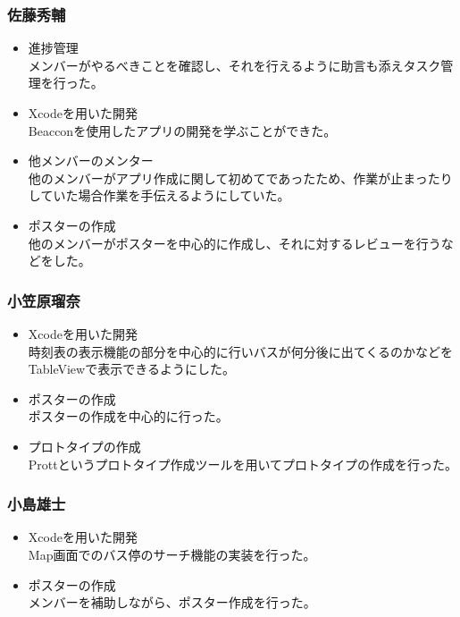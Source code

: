 \documentclass[openany,11pt,papersize]{jsbook}
\begin{document}
\subsubsection{佐藤秀輔}
\begin{itemize}
	\item 進捗管理\\
    メンバーがやるべきことを確認し、それを行えるように助言も添えタスク管理を行った。
	\item Xcodeを用いた開発\\
    Beacconを使用したアプリの開発を学ぶことができた。
  \item 他メンバーのメンター\\
    他のメンバーがアプリ作成に関して初めてであったため、作業が止まったりしていた場合作業を手伝えるようにしていた。
  \item ポスターの作成\\
    他のメンバーがポスターを中心的に作成し、それに対するレビューを行うなどをした。
\end{itemize}

\subsubsection{小笠原瑠奈}
\begin{itemize}
	\item Xcodeを用いた開発\\
    時刻表の表示機能の部分を中心的に行いバスが何分後に出てくるのかなどをTableViewで表示できるようにした。
  \item ポスターの作成\\
    ポスターの作成を中心的に行った。
  \item プロトタイプの作成\\
    Prottというプロトタイプ作成ツールを用いてプロトタイプの作成を行った。
\end{itemize}

\subsubsection{小島雄士}
\begin{itemize}
	\item Xcodeを用いた開発\\
    Map画面でのバス停のサーチ機能の実装を行った。
  \item ポスターの作成\\
    メンバーを補助しながら、ポスター作成を行った。
\end{itemize}
\end{document}

